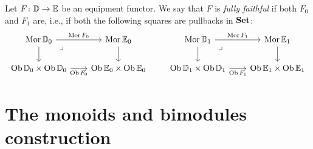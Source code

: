 \documentclass[12pt,oneside,article,draft]{memoir}
\begin{document}
\begin{definition}

Let $F\colon\mathbb{D}\to\mathbb{E}$ be an equipment functor. We say that $F$ is \emph{fully faithful} if both $F_0$ and $F_1$ are, i.e., if both the following squares are pullbacks in $\mathbf{Set}$:
$$
	\begin{tikzcd}[column sep=2em]
		\Mor\dcat{D}_0\ar[r,"\Mor F_0"]\ar[d]\ar[dr,phantom,"\lrcorner" very near start]&\Mor\dcat{E}_0\ar[d]\\
		\Ob\dcat{D}_0\times\Ob\dcat{D}_0\ar[r,"\Ob F_0"']&\Ob\dcat{E}_0\times\Ob\dcat{E}_0
	\end{tikzcd}
\qquad
	\begin{tikzcd}[column sep=2em]
		\Mor\dcat{D}_1\ar[r,"\Mor F_1"]\ar[d]\ar[dr,phantom,"\lrcorner" very near start]&\Mor\dcat{E}_1\ar[d]\\
		\Ob\dcat{D}_1\times\Ob\dcat{D}_1\ar[r,"\Ob F_1"']&\Ob\dcat{E}_1\times\Ob\dcat{E}_1
	\end{tikzcd}
$$

\end{definition}

\section{The monoids and bimodules construction}
\end{document}
